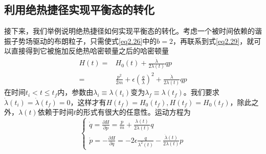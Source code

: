 \subsection{利用绝热捷径实现平衡态的转化}

\qquad 接下来，我们举例说明绝热捷径如何实现平衡态的转化。\cite{Tu2013}考虑一个被时间依赖的谐振子势场驱动的布朗粒子，只需使式\eqref{eq2.26}中的$b=2$，再联系到式\eqref{eq2.29}，就可以直接得到它被施加反绝热哈密顿量之后的哈密顿量
\begin{equation}
    \begin{split}
        H(t)=&H_0 (t) + \frac{\dot{\lambda}}{2 \lambda(t)} q p\\
    =&\frac{p^{2}}{2 m}+\epsilon\left(\frac{q}{\lambda}\right)^{2}+\frac{\dot{\lambda}}{2 \lambda(t)} q p
    \end{split}
    \label{eq2.31}
\end{equation}
在时间$t_i < t \leq t_f$内，参数由$\lambda_{i} \equiv \lambda(t_i)$变为$\lambda_{f} \equiv \lambda(t_f)$。我们要求$\dot{\lambda}\left(t_{i}\right)=\dot{\lambda}\left(t_{f}\right)=0$，这样才有$H\left(t_{f}\right)=H_0 \left(t_{f}\right), H\left(t_{f}\right)=H_0 \left(t_{f}\right)$，除此之外，$\lambda (t)$依赖于时间$t$的形式有很大的任意性。运动方程为
\begin{equation}
    \left\{\begin{array}{l}
        \dot{q}=\frac{\partial H}{\partial p}=\frac{p}{m}+\frac{\lambda(t)}{2 \lambda(t)} q \\
        \dot{p}=-\frac{\partial H}{\partial q}=-2 \epsilon \frac{q}{\lambda^{2}(t)}-\frac{\dot{\lambda}(t)}{2 \lambda(t)} p
        \end{array}\right.
    \label{eq31.5}
\end{equation}


